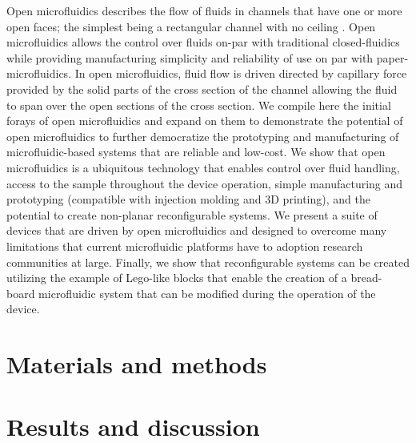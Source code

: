 Open microfluidics describes the flow of fluids in channels that have one or more open faces; the simplest being a rectangular channel with no ceiling \cite{Berthier2012, Casavant2013}. Open microfluidics allows the control over fluids on-par with traditional closed-fluidics while providing manufacturing simplicity and reliability of use on par with paper-microfluidics. In open microfluidics, fluid flow is driven directed by capillary force provided by the solid parts of the cross section of the channel allowing the fluid to span over the open sections of the cross section. We compile here the initial forays of open microfluidics and expand on them to demonstrate the potential of open microfluidics to further democratize the prototyping and manufacturing of microfluidic-based systems that are reliable and low-cost. We show that open microfluidics is a ubiquitous technology that enables control over fluid handling, access to the sample throughout the device operation, simple manufacturing and prototyping (compatible with injection molding and 3D printing), and the potential to create non-planar reconfigurable systems. We present a suite of devices that are driven by open microfluidics and designed to overcome many limitations that current microfluidic platforms have to adoption research communities at large. Finally, we show that reconfigurable systems can be created utilizing the example of Lego-like blocks that enable the creation of a bread-board microfluidic system that can be modified during the operation of the device.

\section{Materials and methods}

\section{Results and discussion}

